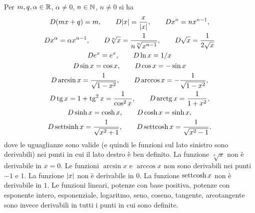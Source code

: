 \begin{theorem}
\mymark{**}
Per $m,q,\alpha \in \mathbb R$, $\alpha \neq 0$, $n\in \mathbb N$, $n\neq 0$
si ha
\begin{gather*}
D (mx + q) = m, \qquad
D {\left|x\right|} = \frac{x}{{\left|x\right|}}, \qquad
D x^n = n x^{n-1}, \\
D x^\alpha = \alpha x^{\alpha -1}, \qquad
D \sqrt[n]{x} = \frac{1}{n\sqrt[n]{x^{n-1}}}, \qquad
D \sqrt{x} = \frac{1}{2\sqrt{x}}
\\
D e^x = e^x, \qquad
D \ln x = 1/x \\
D \sin x = \cos x, \qquad D \cos x = -\sin x\\
D \arcsin x =  \frac{1}{\sqrt{1-x^2}}, \qquad
D \arccos x = -\frac{1}{\sqrt{1-x^2}},\\
D \operatorname{tg} x = 1+ \operatorname{tg}^2 x = \frac{1}{\cos^2 x},
\qquad D \operatorname{arctg} x = \frac{1}{1+x^2},\\
D \sinh x = \cosh x,
\qquad D \cosh x = \sinh x,\\
D \operatorname{settsinh} x = \frac{1}{\sqrt{x^2+1}}, \qquad
D \operatorname{settcosh} x = \frac{1}{\sqrt{x^2-1}}.
\end{gather*}
dove le uguaglianze sono valide (e quindi le funzioni sul lato sinistro sono derivabili) nei punti in cui il lato destro è ben definito.
La funzione $\sqrt[n]{x}$
non è derivabile in $x=0$.
Le funzioni $\arcsin x$ e $\arccos x$ non sono derivabili nei punti $-1$ e $1$.
La funzione ${\left|x\right|}$ non è derivabile in $0$.
La funzione $\operatorname{settcosh} x$ non è derivabile in $1$.
Le funzioni lineari, potenze con base positiva, potenze con esponente intero,
esponenziale, logaritmo, seno, coseno, tangente, arcotangente sono invece derivabili
in tutti i punti in cui sono definite.
\end{theorem}

